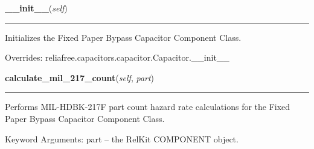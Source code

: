 \hspace{.8\funcindent}\begin{boxedminipage}{\funcwidth}

    \raggedright \textbf{\_\_init\_\_}(\textit{self})

    \vspace{-1.5ex}

    \rule{\textwidth}{0.5\fboxrule}
\setlength{\parskip}{2ex}
    Initializes the Fixed Paper Bypass Capacitor Component Class.

\setlength{\parskip}{1ex}
      Overrides: reliafree.capacitors.capacitor.Capacitor.\_\_init\_\_

    \end{boxedminipage}

    \label{reliafree:capacitors:fixed:PaperBypass:calculate_mil_217_count}

    \vspace{0.5ex}

\hspace{.8\funcindent}\begin{boxedminipage}{\funcwidth}

    \raggedright \textbf{calculate\_mil\_217\_count}(\textit{self}, \textit{part})

    \vspace{-1.5ex}

    \rule{\textwidth}{0.5\fboxrule}
\setlength{\parskip}{2ex}
    Performs MIL-HDBK-217F part count hazard rate calculations for the 
    Fixed Paper Bypass Capacitor Component Class.

    Keyword Arguments: part -- the RelKit COMPONENT object.

\setlength{\parskip}{1ex}
    \end{boxedminipage}

    \label{reliafree:capacitors:fixed:PaperBypass:calculate_mil_217_stress}

    \vspace{0.5ex}

